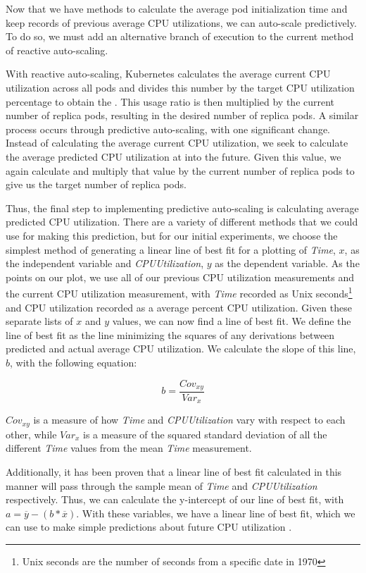 Now that we have methods to calculate the average pod initialization time and
keep records of previous average CPU utilizations, we can auto-scale
predictively. To do so, we must add an alternative branch of execution to the
current method of reactive auto-scaling.

With reactive auto-scaling, Kubernetes calculates the average current CPU utilization
across all pods and divides this number by the target CPU utilization
percentage to obtain the . This usage ratio is then multiplied
by the current number of replica pods, resulting in the desired number of
replica pods. A similar process occurs through predictive auto-scaling, with one
significant change. Instead of calculating the average current CPU utilization,
we seek to calculate the average predicted CPU utilization at
 into the future. Given this value, we again
calculate  and multiply that value by the current number of
replica pods to give us the target number of replica pods.

Thus, the final step to implementing predictive auto-scaling is calculating
average predicted CPU utilization. There are a variety of different methods that
we could use for making this prediction, but for our initial experiments, we
choose the simplest method of generating a linear line of best fit for a
plotting of \textit{Time}, $x$, as the independent variable and
\textit{CPUUtilization}, $y$ as the dependent variable. As the points on our plot, we
use all of our previous CPU utilization measurements and the current CPU
utilization measurement, with \textit{Time}
recorded as Unix seconds\footnote{Unix seconds are the number of seconds from a
specific date in 1970} and CPU utilization recorded as a average percent CPU
utilization. Given these separate lists of $x$ and $y$ values, we can now find a
line of best fit. We define the line of best fit as the line minimizing the
squares of any derivations between predicted and actual average CPU utilization.
We calculate the slope of this line, $b$, with the following equation:

\[ b = \frac{Cov_{xy}}{Var_{x}}\]

$Cov_{xy}$ is a measure of how \textit{Time} and \textit{CPUUtilization} vary
with respect to each other, while $Var_{{x}}$ is a measure of the squared standard
deviation of all the different \textit{Time} values from the mean \textit{Time}
measurement.

Additionally, it has been proven that a linear line of best fit calculated in
this manner will pass through the sample mean of \textit{Time} and
\textit{CPUUtilization} respectively. Thus, we can calculate the y-intercept of
our line of best fit,  with $a = \overline{y} - (b * \overline{x})$. With
these variables, we have a linear line of best fit, which we can use to make
simple predictions about future CPU utilization \cite{line-of-best-fit}.


